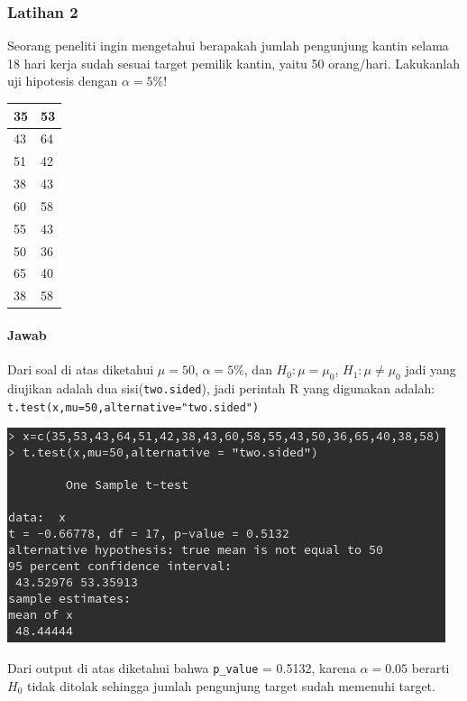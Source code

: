 \documentclass[a4paper,12pt]{article}
\begin{document}
\newpage

\subsubsection{Latihan 2}
Seorang peneliti ingin mengetahui berapakah jumlah pengunjung kantin selama 18 hari kerja sudah sesuai target pemilik kantin, yaitu 50 orang/hari. Lakukanlah uji hipotesis dengan $\alpha = 5\%$! 
\begin{table}[!ht]
    \centering
    \begin{tabular}{|l|l|}
        \hline
        35 & 53 \\ \hline
        43 & 64 \\ \hline
        51 & 42 \\ \hline
        38 & 43 \\ \hline
        60 & 58 \\ \hline
        55 & 43 \\ \hline
        50 & 36 \\ \hline
        65 & 40 \\ \hline
        38 & 58 \\ \hline
    \end{tabular}
\end{table}
\paragraph{Jawab\\}
Dari soal di atas diketahui $\mu = 50$, $\alpha = 5\%$, dan $H_{0} : \mu = \mu_{0}$, $H_{1} : \mu \neq \mu_{0}$ jadi yang diujikan adalah dua sisi(\texttt{two.sided}), jadi perintah R yang digunakan adalah:\\
\texttt{t.test(x,mu=50,alternative="two.sided")}\\
\begin{center}
    \includegraphics[width=0.8\linewidth]{lat2.png}
\end{center}
Dari output di atas diketahui bahwa \texttt{p\_value} = 0.5132, karena $\alpha = 0.05$ berarti $H_{0}$ tidak ditolak sehingga jumlah pengunjung target sudah memenuhi target.
\end{document}
